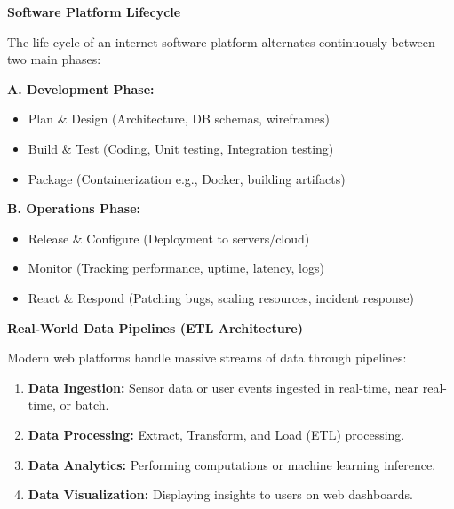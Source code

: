 \documentclass[8pt, a4paper]{article}
\begin{document}
\begin{conceptbox}
\textbf{Software Platform Lifecycle}

\medskip
The life cycle of an internet software platform alternates continuously between two main phases:

\medskip
\textbf{A. Development Phase:}
\begin{itemize}
  \item Plan \& Design (Architecture, DB schemas, wireframes)
  \item Build \& Test (Coding, Unit testing, Integration testing)
  \item Package (Containerization e.g., Docker, building artifacts)
\end{itemize}

\textbf{B. Operations Phase:}
\begin{itemize}
  \item Release \& Configure (Deployment to servers/cloud)
  \item Monitor (Tracking performance, uptime, latency, logs)
  \item React \& Respond (Patching bugs, scaling resources, incident response)
\end{itemize}
\end{conceptbox}

\begin{conceptbox}
\textbf{Real-World Data Pipelines (ETL Architecture)}

\smallskip
Modern web platforms handle massive streams of data through pipelines:
\begin{enumerate}
  \item \textbf{Data Ingestion:} Sensor data or user events ingested in real-time, near real-time, or batch.
  \item \textbf{Data Processing:} Extract, Transform, and Load (ETL) processing.
  \item \textbf{Data Analytics:} Performing computations or machine learning inference.
  \item \textbf{Data Visualization:} Displaying insights to users on web dashboards.
\end{enumerate}
\end{conceptbox}
\end{document}
